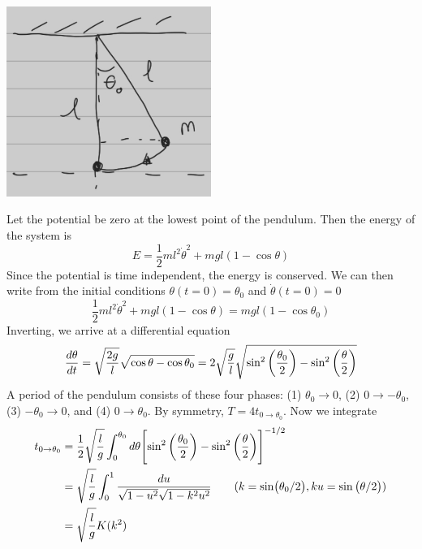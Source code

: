 \documentclass[12pt]{article}
\begin{document}
\begin{problem}{1}
\begin{solution}
    \begin{center}
        \includegraphics[width=0.5\textwidth]{hw2_p1.jpg} 
    \end{center}
    Let the potential be zero at the lowest point of the pendulum. Then the
    energy of the system is
    \begin{equation}
        E=\frac12ml^2\dot{\theta}^2+mgl(1-\cos\theta)
    \end{equation}
    Since the potential is time independent, the energy is conserved. We can 
    then write from the initial conditions
    $\theta(t=0)=\theta_0$ and $\dot{\theta}(t=0)=0$
    \begin{equation}
        \frac12ml^2\dot{\theta}^2+mgl(1-\cos\theta)=mgl(1-\cos\theta_0)
    \end{equation}
    Inverting, we arrive at a differential equation
    \begin{equation}
        \frac{d\theta}{dt}
        =\sqrt{\frac{2g}{l}}\sqrt{\cos\theta-\cos\theta_0}
        =2\sqrt{\frac{g}{l}}
        \sqrt{\sin^2\qty(\frac{\theta_0}{2})-\sin^2\qty(\frac{\theta}{2})} 
    \end{equation}
    A period of the pendulum consists of these four phases: (1) $\theta_0\to0$,
    (2) $0\to-\theta_0$, (3) $-\theta_0\to0$, and (4) $0\to\theta_0$. By
    symmetry, $T=4t_{0\to\theta_0}$. Now we integrate
    \begin{align}
        t_{0\to\theta_0}&=\frac12\sqrt{\frac{l}{g}}\int_0^{\theta_0}d\theta
        \qty[\sin^2\qty(\frac{\theta_0}{2})-\sin^2\qty(\frac{\theta}{2})]^{-1/2}
        \notag\\
                        &=\sqrt{\frac{l}{g}}\int_0^1\frac{du}{\sqrt{1-u^2}\sqrt{1-k^2u^2}}\tag{$k=\sin(\theta_0/2),ku=\sin\qty(\theta/2)$}\\
                        &=\sqrt{\frac{l}{g}}K(k^2)
    \end{align}

\end{solution}
\end{problem}
\end{document}
